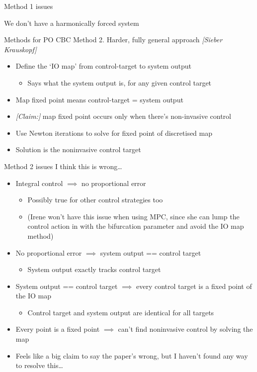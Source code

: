 \documentclass[presentation]{beamer}
\begin{document}
\begin{frame}[label={sec:orgdeeb5da}]{Method 1 issues}
\begin{center}
We don't have a harmonically forced system
\end{center}
\end{frame}

\begin{frame}[<+->][label={sec:org478d7f7}]{Methods for PO CBC}
Method 2. Harder, fully general approach \emph{[Sieber Krauskopf]}
\vfill
\begin{itemize}
\item Define the `IO map' from control-target to system output
\begin{itemize}
\item Says what the system output is, for any given control target
\end{itemize}
\item Map fixed point means control-target = system output
\item \emph{[Claim:]} map fixed point occurs only when there's non-invasive control
\item Use Newton iterations to solve for fixed point of discretised map
\item Solution is the noninvasive control target
\end{itemize}
\end{frame}

\begin{frame}[<+->][label={sec:org5e234af}]{Method 2 issues}
I think this is wrong\ldots{}
\begin{itemize}
\item Integral control \(\implies\) no proportional error
\begin{itemize}
\item Possibly true for other control strategies too
\item (Irene won't have this issue when using MPC, since she can lump the control action in with the bifurcation parameter and avoid the IO map method)
\end{itemize}
\item No proportional error \(\implies\) system output == control target
\begin{itemize}
\item System output exactly tracks control target
\end{itemize}
\item System output == control target \(\implies\) every control target is a fixed point of the IO map
\begin{itemize}
\item Control target and system output are identical for all targets
\end{itemize}
\item Every point is a fixed point \(\implies\) can't find noninvasive control by solving the map
\item Feels like a big claim to say the paper's wrong, but I haven't found any way to resolve this\ldots{}
\end{itemize}
\end{frame}
\end{document}
